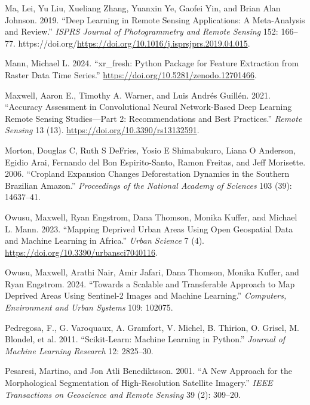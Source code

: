\documentclass[
  journal,
  twocolumn]{IEEEtran}
\newlength{\cslhangindent}
\newlength{\cslentryspacingunit} %
\newenvironment{CSLReferences}[2] %
 {%
  \setlength{\parindent}{0pt}
  \ifodd #1
  \let\oldpar\par
  \def\par{\hangindent=\cslhangindent\oldpar}
  \fi
  \setlength{\parskip}{#2\cslentryspacingunit}
 }%
 {}
\begin{document}
\begin{CSLReferences}{1}{0}
\leavevmode{}%
Ma, Lei, Yu Liu, Xueliang Zhang, Yuanxin Ye, Gaofei Yin, and Brian Alan
Johnson. 2019. {``Deep Learning in Remote Sensing Applications: A
Meta-Analysis and Review.''} \emph{ISPRS Journal of Photogrammetry and
Remote Sensing} 152: 166--77.
https://doi.org/\url{https://doi.org/10.1016/j.isprsjprs.2019.04.015}.

\leavevmode{}%
Mann, Michael L. 2024. {``{xr\_fresh: Python Package for Feature
Extraction from Raster Data Time Series}.''}
\url{https://doi.org/10.5281/zenodo.12701466}.

\leavevmode{}%
Maxwell, Aaron E., Timothy A. Warner, and Luis Andrés Guillén. 2021.
{``Accuracy Assessment in Convolutional Neural Network-Based Deep
Learning Remote Sensing Studies---Part 2: Recommendations and Best
Practices.''} \emph{Remote Sensing} 13 (13).
\url{https://doi.org/10.3390/rs13132591}.

\leavevmode{}%
Morton, Douglas C, Ruth S DeFries, Yosio E Shimabukuro, Liana O
Anderson, Egidio Arai, Fernando del Bon Espirito-Santo, Ramon Freitas,
and Jeff Morisette. 2006. {``Cropland Expansion Changes Deforestation
Dynamics in the Southern Brazilian Amazon.''} \emph{Proceedings of the
National Academy of Sciences} 103 (39): 14637--41.

\leavevmode{}%
Owusu, Maxwell, Ryan Engstrom, Dana Thomson, Monika Kuffer, and Michael
L. Mann. 2023. {``Mapping Deprived Urban Areas Using Open Geospatial
Data and Machine Learning in Africa.''} \emph{Urban Science} 7 (4).
\url{https://doi.org/10.3390/urbansci7040116}.

\leavevmode{}%
Owusu, Maxwell, Arathi Nair, Amir Jafari, Dana Thomson, Monika Kuffer,
and Ryan Engstrom. 2024. {``Towards a Scalable and Transferable Approach
to Map Deprived Areas Using Sentinel-2 Images and Machine Learning.''}
\emph{Computers, Environment and Urban Systems} 109: 102075.

\leavevmode{}%
Pedregosa, F., G. Varoquaux, A. Gramfort, V. Michel, B. Thirion, O.
Grisel, M. Blondel, et al. 2011. {``Scikit-Learn: Machine Learning in
{P}ython.''} \emph{Journal of Machine Learning Research} 12: 2825--30.

\leavevmode{}%
Pesaresi, Martino, and Jon Atli Benediktsson. 2001. {``A New Approach
for the Morphological Segmentation of High-Resolution Satellite
Imagery.''} \emph{IEEE Transactions on Geoscience and Remote Sensing} 39
(2): 309--20.


\end{CSLReferences}
\end{document}

